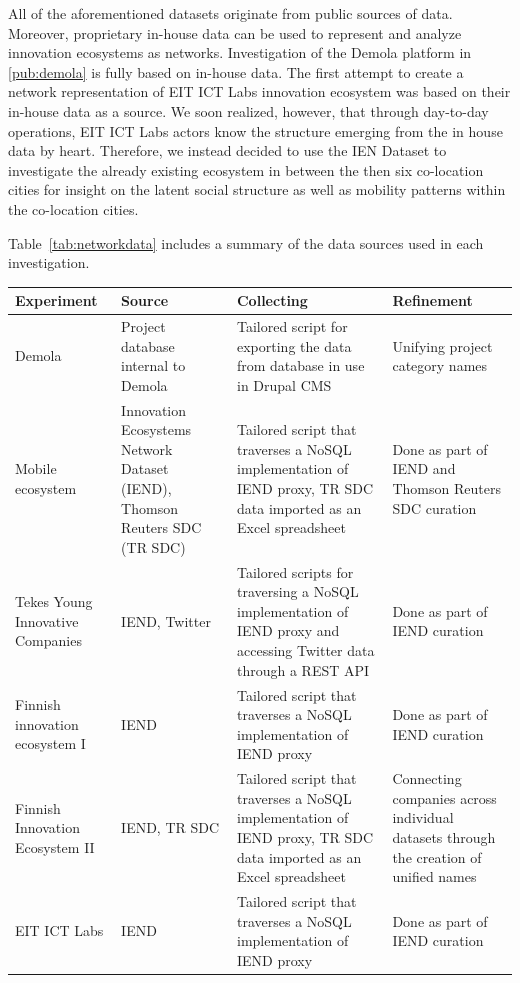 All of the aforementioned datasets originate from public sources of data. Moreover, proprietary in-house data can be used to represent and analyze innovation ecosystems as networks. Investigation of the Demola platform in \ref{pub:demola} is fully based on in-house data. The first attempt to create a network representation of EIT ICT Labs innovation ecosystem was based on their in-house data as a source. We soon realized, however, that through day-to-day operations, EIT ICT Labs actors know the structure emerging from the in house data by heart. Therefore, we instead decided to use the IEN Dataset to investigate the already existing ecosystem in between the then six co-location cities for insight on the latent social structure as well as  mobility patterns within the co-location cities.

Table~\ref{tab:networkdata} includes a summary of the data sources used in each investigation.

\begingroup
{}\label{tab:networkdata}
\begin{tabular}{p{3cm} p{2cm} p{4cm} p{3cm}}
\toprule
Experiment & Source & Collecting & Refinement \\
\midrule

Demola &
Project database internal to Demola &
Tailored script for exporting the data from database in use in Drupal CMS &
Unifying project category names \\

Mobile ecosystem &
Innovation Ecosystems Network Dataset (IEND), Thomson Reuters SDC (TR SDC) &
Tailored script that traverses a NoSQL implementation of IEND proxy, TR SDC data imported as an Excel spreadsheet &
Done as part of IEND and Thomson Reuters SDC curation \\

Tekes Young Innovative Companies &
IEND, Twitter &
Tailored scripts for traversing a NoSQL implementation of IEND proxy and accessing Twitter data through a REST API &
Done as part of IEND curation \\

Finnish innovation ecosystem I & 
IEND & 
Tailored script that traverses a NoSQL implementation of IEND proxy &
Done as part of IEND curation \\

Finnish Innovation Ecosystem II  &
IEND, TR SDC &
Tailored script that traverses a NoSQL implementation of IEND proxy, TR SDC data imported as an Excel spreadsheet &
Connecting companies across individual datasets through the creation of unified names \\

EIT ICT Labs &
IEND &
Tailored script that traverses a NoSQL implementation of IEND proxy &
 Done as part of IEND curation \\
\bottomrule
\end{tabular}
\endgroup

